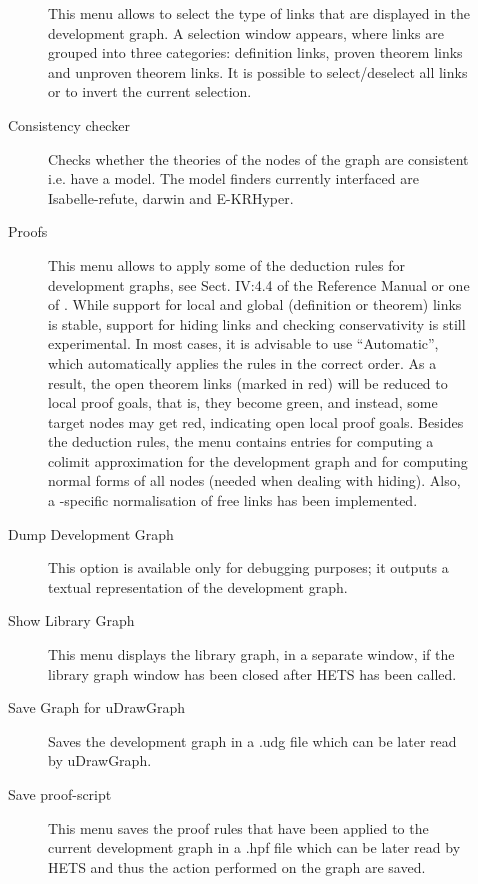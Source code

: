 \documentclass{article}
\newcommand{\normalTEXTSC}[2]{{#1\scriptsize#2}}
\newcommand     {\Hets}{\normalTEXTSC{H}{ETS}\xspace}
\begin{document}
\begin{description}
\begin{description}
This menu allows to select the type of links that are displayed in the
development graph. A selection window appears, where links are grouped into
three categories: definition links, proven theorem links and unproven
theorem links. It is possible to select/deselect all links or to invert the
current selection.

\item[Consistency checker]

 Checks whether the theories of the nodes of the graph are consistent
 i.e. have a model. The model finders currently interfaced are
 Isabelle-refute, darwin and E-KRHyper.

\item[Proofs] This menu allows to apply some of the deduction rules
  for development graphs, see Sect. IV:4.4 of the \CASL Reference
  Manual \cite{CASL/RefManual} or one of
  \cite{Habil,MossakowskiEtAl05,MossakowskiEtAl07b}. While support for
  local and global (definition or theorem) links is stable, support
  for hiding links and checking conservativity is still experimental.
  In most cases, it is advisable to use ``Automatic'', which
  automatically applies the rules in the correct order. As a result,
  the open theorem links (marked in red) will be reduced to local
  proof goals, that is, they become green, and instead, some target nodes
  may get red, indicating open local proof goals.
  Besides the deduction rules, the menu contains entries for computing
  a colimit approximation for the development graph and for
  computing normal forms of all nodes (needed when dealing with hiding).
  Also, a \CASL-specific normalisation of free links has been
  implemented.

\item[Dump Development Graph] This option is available only for
 debugging purposes; it outputs a textual representation
 of the development graph.

\item[Show Library Graph] This menu displays the library graph, in a separate
  window, if the library graph window has been closed after \Hets has been
  called.

\item[Save Graph for uDrawGraph] Saves the development graph in a .udg file
 which can be later read by uDrawGraph.

\item[Save proof-script] This menu saves the proof rules that have been applied
 to the current development graph in a .hpf file which can be later read by
 \Hets and thus the action performed on the graph are saved.


\end{description}
\end{description}
\end{document}
